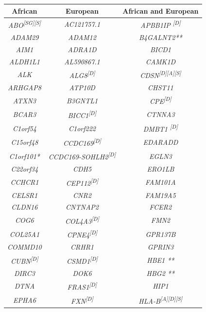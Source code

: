 \begin{refsection}
\begin{otherlanguage}{english}
\begin{scriptsize}
\begin{longtable}{ccc}
\toprule
\rowcolor[HTML]{C0C0C0} 
African & European & African and European \\ \midrule
\textit{ABO\textsuperscript{{[}SG{]}{[}S{]}}} & \textit{AC121757.1} & \textit{APBB1IP	\textsuperscript{{[}D{]}}} \\
\textit{ADAM29} & \textit{ADAM12} & \textit{B4GALNT2**} \\
\textit{AIM1} & \textit{ADRA1D} & \textit{BICD1} \\
\textit{ALDH1L1} & \textit{AL590867.1} & \textit{CAMK1D} \\
\textit{ALK} & \textit{ALG8\textsuperscript{{[}D{]}}} & \textit{CDSN\textsuperscript{{[}D{]}{[}A{]}{[}S{]}}} \\
\textit{ARHGAP8} & \textit{ATP10D} & \textit{CHST11} \\
\textit{ATXN3} & \textit{B3GNTL1} & \textit{CPE\textsuperscript{{[}D{]}}} \\
\textit{BCAR3} & \textit{BICC1\textsuperscript{{[}D{]}}} & \textit{CTNNA3} \\
\textit{C1orf54} & \textit{C1orf222} & \textit{DMBT1		\textsuperscript{{[}D{]}}} \\
\textit{C15orf48} & \textit{CCDC169\textsuperscript{{[}D{]}}} & \textit{EDARADD} \\
\textit{C1orf101*} & \textit{CCDC169-SOHLH2\textsuperscript{{[}D{]}}} & \textit{EGLN3} \\
\textit{C22orf34} & \textit{CDH5} & \textit{ERO1LB} \\
\textit{CCHCR1} & \textit{CEP112\textsuperscript{{[}D{]}}} & \textit{FAM101A} \\
\textit{CELSR1} & \textit{CNR2} & \textit{FAM19A5} \\
\textit{CLDN16} & \textit{CNTNAP2} & \textit{FCER2} \\
\textit{COG6} & \textit{COL4A3\textsuperscript{{[}D{]}}} & \textit{FMN2} \\
\textit{COL25A1} & \textit{CPNE4\textsuperscript{{[}D{]}}} & \textit{GPR137B} \\
\textit{COMMD10} & \textit{CRHR1} & \textit{GPRIN3} \\
\textit{CUBN\textsuperscript{{[}D{]}}} & \textit{CSMD1\textsuperscript{{[}D{]}}} & \textit{HBE1 **} \\
\textit{DIRC3} & \textit{DOK6} & \textit{HBG2 **} \\
\textit{DTNA} & \textit{FRAS1\textsuperscript{{[}D{]}}} & \textit{HIP1} \\
\textit{EPHA6} & \textit{FXN\textsuperscript{{[}D{]}}} & \textit{HLA-B\textsuperscript{{[}A{]}{[}D{]}{[}S{]}}} \\

\end{longtable}
\end{scriptsize}
\end{otherlanguage}
\end{refsection}
